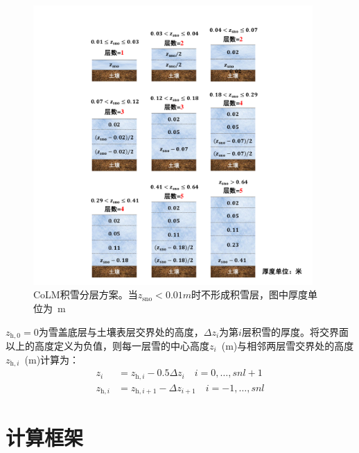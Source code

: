 {
  \begin{figure}[htbp]
    \centering
    \includegraphics[width=0.95\textwidth]{Figures/模式构架/积雪分层.pdf}
    \caption[CoLM积雪分层方案]{CoLM积雪分层方案。当$z_{\mathrm{sno}}<0.01 \unit{m}$时不形成积雪层，图中厚度单位为~\unit{m}}
    \label{fig:积雪分层}
  \end{figure}
}

$z_{\mathrm{h,0}}=0$为雪盖底层与土壤表层交界处的高度，$\Delta z_{i}$为第$i$层积雪的厚度。将交界面以上的高度定义为负值，则每一层雪的中心高度$z_i$~(m)与相邻两层雪交界处的高度$z_{\mathrm{h},i}$~(m)计算为：
\begin{equation}
  \begin{aligned}
    z_{i} &= z_{\mathrm{h},i}-0.5 \Delta z_{i} \quad i=0, \ldots, snl+1 \\
    z_{\mathrm{h},i} &= z_{\mathrm{h}, i+1}-\Delta z_{i+1}  \quad i=-1, \ldots, snl
  \end{aligned}
\end{equation}


\section{计算框架}\label{计算框架}

